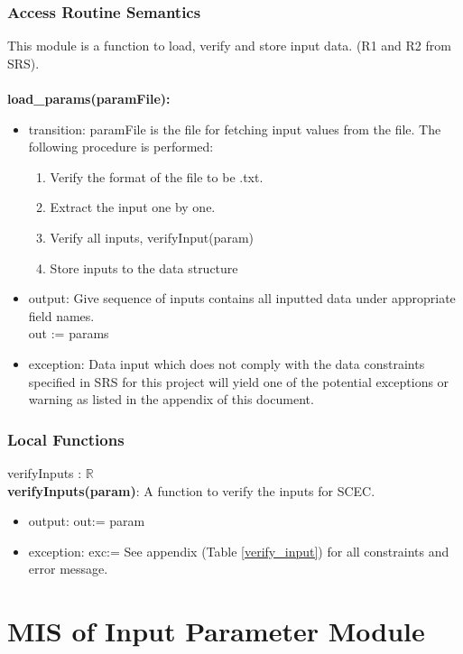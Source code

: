 \documentclass[12pt, titlepage]{article}
\begin{document}
\subsubsection{Access Routine Semantics}
This module is a function to load, verify and store input data. (R1 and R2 from SRS). \\ \\
\noindent \textbf{load\_params(paramFile):}
\begin{itemize}
\item transition:  paramFile is the file for fetching input values from the file. The following procedure is performed: 
\begin{enumerate}
    \item Verify the format of the file to be .txt. 
    \item Extract the input one by one. 
    \item Verify all inputs, verifyInput(param)
    \item Store inputs to the data structure 
\end{enumerate}
\item output: Give sequence of inputs contains all inputted data under appropriate field names. \\ 
out := params 
\item exception: Data input which does not comply with the data constraints specified in SRS for this project will yield one of the potential exceptions or warning as listed in the appendix of this document. 
\end{itemize}

\subsubsection{Local Functions}

verifyInputs : $\mathbb{R}$ \\ 
\textbf{verifyInputs(param)}: A function to verify the inputs for SCEC. 
\begin{itemize} 
    \item output: out:= param
    \item exception: exc:= See appendix (Table \ref{verify_input}) for all constraints and error message.  
    
\end{itemize}


\newpage
\section{MIS of Input Parameter Module} \label{Input_Parameter_Module} 
\end{document}
